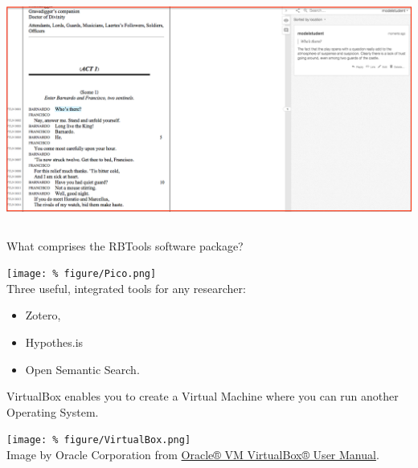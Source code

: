 \documentclass[unknownkeysallowed,usepdftitle=false, parskip=full, aspectratio=169]{beamer}
\newcommand{\secvariable}{nothing}
\newcommand{\mysection}[1]{\renewcommand{\secvariable}{#1}
}
\begin{document}
\begin{frame}
{\begin{columns}[t]
\begin{column}[c]{0.5\textwidth}
\includegraphics[width=1\textwidth,height=0.25\textheight,keepaspectratio]{figure/Hypothesis.png}\\

   \end{column}
  \end{columns}
}
 
\end{frame}

\mysection{radar}
\begin{frame}\label{\secvariable}

What comprises the RBTools software package?

\texttt{[image: \%
figure/Pico.png]}\\

Three useful, integrated tools for any researcher:
\begin{itemize}
    \item Zotero,
    \item Hypothes.is 
    \item Open Semantic Search.
    \end{itemize}

\end{frame}

\mysection{line}
\begin{frame}\label{\secvariable}

VirtualBox enables you to create a Virtual Machine where you can run another Operating System.
  \vspace{0.5cm}
  
  \texttt{[image: \%
figure/VirtualBox.png]}\\  
\tiny Image by Oracle Corporation from \href{https://www.virtualbox.org/manual/}{Oracle® VM VirtualBox® User Manual}.

\end{frame}
\end{document}
